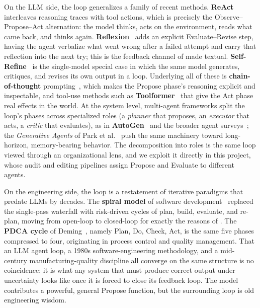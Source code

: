 On the LLM side, the loop generalizes a family of recent methods. \textbf{ReAct}~\cite{yao2022react} interleaves reasoning traces with tool actions, which is precisely the Observe--Propose--Act alternation: the model thinks, acts on the environment, reads what came back, and thinks again. \textbf{Reflexion}~\cite{shinn2023reflexion} adds an explicit Evaluate--Revise step, having the agent verbalize what went wrong after a failed attempt and carry that reflection into the next try; this is the feedback channel of  made textual. \textbf{Self-Refine}~\cite{madaan2023selfrefine} is the single-model special case in which the same model generates, critiques, and revises its own output in a loop. Underlying all of these is \textbf{chain-of-thought} prompting~\cite{wei2022chain}, which makes the Propose phase's reasoning explicit and inspectable, and tool-use methods such as \textbf{Toolformer}~\cite{schick2023toolformer} that give the Act phase real effects in the world. At the system level, multi-agent frameworks split the loop's phases across specialized roles (a \emph{planner} that proposes, an \emph{executor} that acts, a \emph{critic} that evaluates), as in \textbf{AutoGen}~\cite{wu2023autogen} and the broader agent surveys~\cite{xi2023rise,wang2023survey}; the \emph{Generative Agents} of Park et al.~\cite{park2023generative} push the same machinery toward long-horizon, memory-bearing behavior. The decomposition into roles is the same loop viewed through an organizational lens, and we exploit it directly in this project, whose audit and editing pipelines assign Propose and Evaluate to different agents.

On the engineering side, the loop is a restatement of iterative paradigms that predate LLMs by decades. The \textbf{spiral model} of software development~\cite{boehm1988spiral} replaced the single-pass waterfall with risk-driven cycles of plan, build, evaluate, and re-plan, moving from open-loop to closed-loop for exactly the reasons of . The \textbf{PDCA cycle} of Deming~\cite{deming1986}, namely Plan, Do, Check, Act, is the same five phases compressed to four, originating in process control and quality management. That an LLM agent loop, a 1980s software-engineering methodology, and a mid-century manufacturing-quality discipline all converge on the same structure is no coincidence: it is what any system that must produce correct output under uncertainty looks like once it is forced to close its feedback loop. The model contributes a powerful, general Propose function, but the surrounding loop is old engineering wisdom.


